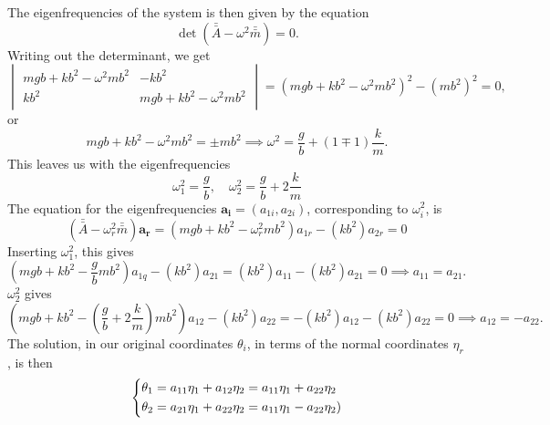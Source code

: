 \documentclass{article}
\begin{document}
    The eigenfrequencies of the system is then given by the equation
    \begin{equation*}
        \det(\bar {\bar A} - \omega^2 \bar {\bar m}) = 0.
    \end{equation*}
    Writing out the determinant, we get 
    \begin{equation*}
        \begin{vmatrix}
            mgb + kb^2 - \omega^2 mb^2 & -kb^2 \\
            kb^2 & mgb + kb^2 - \omega^2 mb^2
        \end{vmatrix}
         = (mgb + kb^2 - \omega^2 mb^2)^2 - (mb^2)^2 = 0,
    \end{equation*}
    or
    \begin{equation*}
    mgb + kb^2 - \omega^2 mb^2 = \pm mb^2 \implies \omega^2 = \frac{g}{b} + (1 \mp 1)\frac{k}{m}.
    \end{equation*}
    This leaves us with the eigenfrequencies
    \begin{equation*}
        \omega_1^2 = \frac{g}{b}, \quad \omega_2^2 = \frac{g}{b} + 2 \frac{k}{m}
    \end{equation*}
    The equation for the eigenfrequencies $\mathbf{a_i} = (a_{1i}, a_{2i})$, corresponding to $\omega_i^2$, is
    \begin{equation*}
        (\bar {\bar A} - \omega^2_r \bar {\bar m}) \mathbf{a_r} = (mgb + kb^2 - \omega_r^2 mb^2)a_{1r} -(kb^2)a_{2r} = 0
    \end{equation*}
    Inserting $\omega_1^2$, this gives 
    \begin{equation*}
        \left(mgb + kb^2 - \frac{g}{b} mb^2\right)a_{1q} -(kb^2)a_{21} = (kb^2)a_{11} -(kb^2)a_{21} = 0 \implies a_{11} = a_{21}.
    \end{equation*}
    $\omega_2^2$ gives 
    \begin{equation*}
        \left(mgb + kb^2 - \left(\frac{g}{b} +2\frac{k}{m}\right)mb^2\right)a_{12} -(kb^2)a_{22} = -(kb^2)a_{12} -(kb^2)a_{22} = 0 \implies a_{12} = -a_{22}.
    \end{equation*}
    The solution, in our original coordinates $\theta_i$, in terms of the normal coordinates $\eta_r$, is then
    \begin{equation*}
        \begin{dcases}
            \theta_1 = a_{11} \eta_1 + a_{12} \eta_2 = a_{11} \eta_1 + a_{22}\eta_2 \\
            \theta_2 = a_{21} \eta_1 + a_{22} \eta_2 = a_{11} \eta_1 - a_{22} \eta_2) \\
        \end{dcases}
    \end{equation*}
\end{document}
